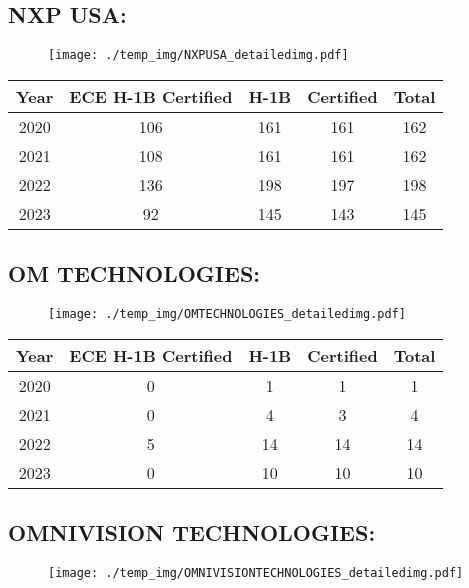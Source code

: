 \documentclass{article}%
\begin{document}
%
\newpage%
\subsection{NXP USA:}%
\label{subsec:NXPUSA}%
\label{NXPUSAdetailed}%


\begin{figure}[htbp]%
\centering%
\texttt{[image: ./temp\_img/NXPUSA\_detailedimg.pdf]}%
\end{figure}

%
\begin{longtable}{c|c|c|c|c}%
\hline%
Year&ECE H{-}1B Certified&H{-}1B&Certified&Total\\%
\hline%
2020&106&161&161&162\\%
\hline%
2021&108&161&161&162\\%
\hline%
2022&136&198&197&198\\%
\hline%
2023&92&145&143&145\\%
\hline%
\end{longtable}

%
\newpage%
\subsection{OM TECHNOLOGIES:}%
\label{subsec:OMTECHNOLOGIES}%
\label{OMTECHNOLOGIESdetailed}%


\begin{figure}[htbp]%
\centering%
\texttt{[image: ./temp\_img/OMTECHNOLOGIES\_detailedimg.pdf]}%
\end{figure}

%
\begin{longtable}{c|c|c|c|c}%
\hline%
Year&ECE H{-}1B Certified&H{-}1B&Certified&Total\\%
\hline%
2020&0&1&1&1\\%
\hline%
2021&0&4&3&4\\%
\hline%
2022&5&14&14&14\\%
\hline%
2023&0&10&10&10\\%
\hline%
\end{longtable}

%
\newpage%
\subsection{OMNIVISION TECHNOLOGIES:}%
\label{subsec:OMNIVISIONTECHNOLOGIES}%
\label{OMNIVISIONTECHNOLOGIESdetailed}%


\begin{figure}[htbp]%
\centering%
\texttt{[image: ./temp\_img/OMNIVISIONTECHNOLOGIES\_detailedimg.pdf]}%
\end{figure}
\end{document}
